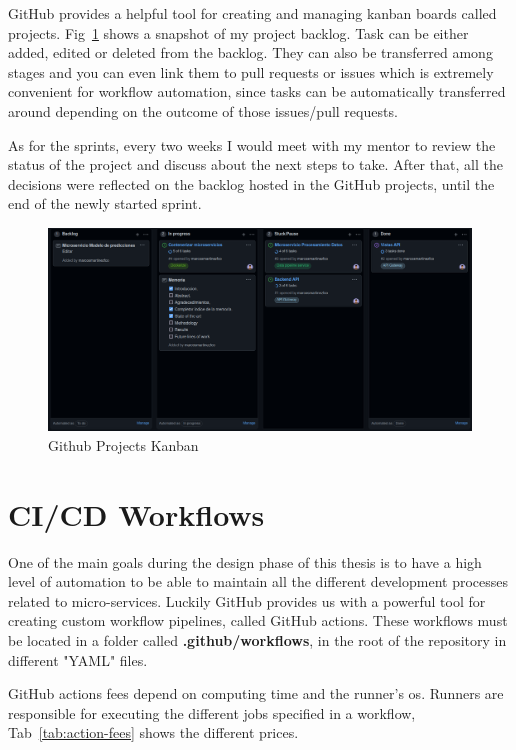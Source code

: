 GitHub provides a helpful tool for creating and managing kanban boards called projects. Fig~\ref{fig:github-projects} shows a snapshot of my project backlog. Task can be either added, edited or deleted from the backlog. They can also be transferred among stages and you can even link them to pull requests or issues which is extremely convenient for workflow automation, since tasks can be automatically transferred around depending on the outcome of those issues/pull requests.

As for the sprints, every two weeks I would meet with my mentor to review the status of the project and discuss about the next steps to take. After that, all the decisions were reflected on the backlog hosted in the GitHub projects, until the end of the newly started sprint.

\begin{figure}[h]
    \centering
    \includegraphics[width=\textwidth]{figures/github-projects.png}
    \caption{Github Projects Kanban}
    \label{fig:github-projects}
\end{figure}

\section{CI/CD Workflows}

One of the main goals during the design phase of this thesis is to have a high level of automation to be able to maintain all the different development processes related to micro-services. Luckily GitHub provides us with a powerful tool for creating custom workflow pipelines, called GitHub actions. These workflows must be located in a folder called \textbf{.github/workflows}, in the root of the repository in different "YAML" files.

GitHub actions fees depend on computing time and the runner's \gls{os}. Runners are responsible for executing the different jobs specified in a workflow, Tab~\ref{tab:action-fees} shows the different prices.

